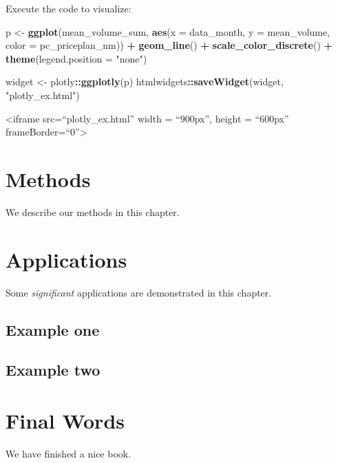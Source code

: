 \documentclass[]{book}
\newenvironment{Shaded}{\begin{snugshade}}{\end{snugshade}}
\newcommand{\DataTypeTok}[1]{\textcolor[rgb]{0.13,0.29,0.53}{#1}}
\newcommand{\KeywordTok}[1]{\textcolor[rgb]{0.13,0.29,0.53}{\textbf{#1}}}
\newcommand{\NormalTok}[1]{#1}
\newcommand{\OperatorTok}[1]{\textcolor[rgb]{0.81,0.36,0.00}{\textbf{#1}}}
\newcommand{\StringTok}[1]{\textcolor[rgb]{0.31,0.60,0.02}{#1}}
\begin{document}
Execute the code to visualize:

\begin{Shaded}
\begin{Highlighting}[]
\NormalTok{p <-}\StringTok{ }\KeywordTok{ggplot}\NormalTok{(mean_volume_sum, }
         \KeywordTok{aes}\NormalTok{(}\DataTypeTok{x =}\NormalTok{ data_month, }\DataTypeTok{y =}\NormalTok{ mean_volume, }\DataTypeTok{color =}\NormalTok{ pc_priceplan_nm)) }\OperatorTok{+}
\StringTok{  }\KeywordTok{geom_line}\NormalTok{() }\OperatorTok{+}
\StringTok{  }\KeywordTok{scale_color_discrete}\NormalTok{() }\OperatorTok{+}
\StringTok{  }\KeywordTok{theme}\NormalTok{(}\DataTypeTok{legend.position =} \StringTok{"none"}\NormalTok{)}
\end{Highlighting}
\end{Shaded}

\begin{Shaded}
\begin{Highlighting}[]
\NormalTok{widget <-}\StringTok{ }\NormalTok{plotly}\OperatorTok{::}\KeywordTok{ggplotly}\NormalTok{(p)}
\NormalTok{htmlwidgets}\OperatorTok{::}\KeywordTok{saveWidget}\NormalTok{(widget, }\StringTok{"plotly_ex.html"}\NormalTok{)}
\end{Highlighting}
\end{Shaded}

\textless{}iframe src=``plotly\_ex.html'' width = ``900px'', height = ``600px'' frameBorder=``0''\textgreater{}

\hypertarget{methods}{%
\chapter{Methods}\label{methods}}

We describe our methods in this chapter.

\hypertarget{applications}{%
\chapter{Applications}\label{applications}}

Some \emph{significant} applications are demonstrated in this chapter.

\hypertarget{example-one}{%
\section{Example one}\label{example-one}}

\hypertarget{example-two}{%
\section{Example two}\label{example-two}}

\hypertarget{final-words}{%
\chapter{Final Words}\label{final-words}}

We have finished a nice book.


\end{document}
